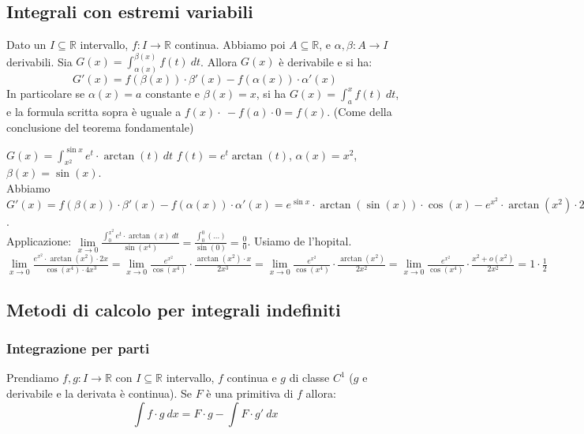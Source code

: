 \subsection{Integrali con estremi variabili}
\begin{theorem}
Dato un $I \subseteq \mathbb{R}$ intervallo, $f: I \to \mathbb{R}$ continua. Abbiamo poi $A\subseteq \mathbb{R}$, e $\alpha,\beta:A \to I$ derivabili. Sia $G(x) = \int_{\alpha(x)}^{\beta(x)} f(t) \:dt$. Allora $G(x)$ è derivabile e si ha:
\[G'(x) = f(\beta(x)) \cdot \beta'(x) - f(\alpha(x)) \cdot \alpha'(x)\]
In particolare se $\alpha(x) = a$ constante e $\beta(x) = x$, si ha $G(x) = \int_a^x f(t)\:dt$, e la formula scritta sopra è uguale a $f(x) \cdot \ - f(a) \cdot 0 = f(x)$. (Come della conclusione del teorema fondamentale)
\end{theorem}

\begin{example}
$G(x) = \int_{x^2}^{\sin{x}}e^t \cdot \arctan(t) \:dt$ \hfill $f(t) = e^t \arctan(t)$, $\alpha(x) = x^2$, $\beta(x) = \sin(x)$.\\
Abbiamo $G'(x) = f(\beta(x)) \cdot \beta'(x) - f(\alpha(x)) \cdot \alpha'(x) = e^{\sin{x}} \cdot \arctan(\sin(x)) \cdot \cos(x) - e^{x^2} \cdot \arctan(x^2) \cdot 2$.\\
Applicazione: $\lim\limits_{x\to 0}\frac{\int_0^{x^2} e^t \cdot \arctan(x) \:dt}{\sin(x^4)} = \frac{\int_0^0 (...)}{\sin(0)} = \frac{0}{0}$. Usiamo de l'hopital.\\
$\lim\limits_{x\to 0} \frac{e^{x^2}\cdot \arctan(x^2) \cdot 2x}{\cos(x^4) \cdot 4x^3} = \lim\limits_{x\to 0}\frac{e^{x^2}}{\cos(x^4)}\cdot\frac{\arctan(x^2) \cdot x}{2x^3} = \lim\limits_{x\to 0} \frac{e^{x^2}}{\cos(x^4)}\cdot \frac{\arctan(x^2)}{2x^2} = \lim\limits_{x\to 0}\frac{e^{x^2}}{\cos(x^4)}\cdot\frac{x^2 + o(x^2)}{2x^2} = 1 \cdot \frac{1}{2}$
\end{example}

\subsection{Metodi di calcolo per integrali indefiniti}
\subsubsection{Integrazione per parti}
Prendiamo $f,g: I \to \mathbb{R}$ con $I\subseteq \mathbb{R}$ intervallo, $f$ continua e $g$ di classe $C^1$ ($g$ e derivabile e la derivata è continua). Se $F$ è una primitiva di $f$ allora:
\vspace{-5pt}
\[\int f\cdot g\:dx = F \cdot g - \int F \cdot g' \:dx\]

